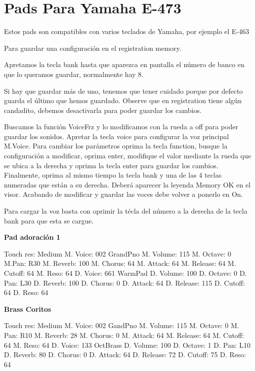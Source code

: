 \section*{Pads Para Yamaha E-473}

Estos pads son compatibles con varios teclados de Yamaha, por ejemplo el E-463

Para guardar una configuraci\'on en el registration memory.

Apretamos la tecla bank hasta que aparezca en pantalla el n\'umero de banco en que lo queramos guardar, normalmente hay 8.

Si hay que guardar m\'as de uno, tenemos que tener cuidado porque por defecto guarda el \'ultimo que hemos guardado.
Observe que en registration tiene alg\'un candadito, debemos desactivarla para poder guardar los cambios.

Buscamos la funci\'on VoiceFrz y lo modificamos con la rueda a off para poder guardar los sonidos.
Apretar la tecla voice para configurar la voz principal M.Voice.
Para cambiar los par\'ametros oprima la tecla function, busque la configuraci\'on a modificar, oprima enter, modifique el valor mediante la rueda que se ubica a la derecha
y oprima la tecla enter para guardar los cambios.
Finalmente, oprima al mismo tiempo la tecla bank y una de las 4 teclas numeradas que est\'an a su derecha. Deber\'a aparecer la leyenda Memory OK en el visor.
Acabando de modificar y guardar las voces debe volver a ponerlo en On.

Para cargar la voz basta con oprimir la t\'ecla del n\'umero a la derecha de la tecla bank para que esta se cargue.

\textbf{Pad adoraci\'on 1}
\vskip 25pt

Touch res: Medium
M. Voice: 002 GrandPno
M. Volume: 115
M. Octave: 0
M.Pan: R30
M. Reverb: 100
M. Chorus: 64
M. Attack: 64
M. Release: 64
M. Cutoff: 64
M. Reso: 64
D. Voice: 661 WarmPad
D. Volume: 100
D. Octave: 0
D. Pan: L30
D. Reverb: 100
D. Chorus: 0
D. Attack: 64
D. Release: 115
D. Cutoff: 64
D. Reso: 64
\vskip 25pt

\textbf{Brass Coritos}
\vskip 25pt

Touch res: Medium
M. Voice: 002 GandPno
M. Volume: 115
M. Octave: 0
M. Pan: R10
M. Reverb: 28
M. Chorus: 0
M. Attack: 64
M. Release: 64
M. Cutoff: 64
M. Reso: 64
D. Voice: 133 OctBrass
D. Volume: 100
D. Octave: 1
D. Pan: L10
D. Reverb: 80
D. Chorus: 0
D. Attack: 64
D. Release: 72
D. Cutoff: 75
D. Reso: 64
\vskip 25pt

